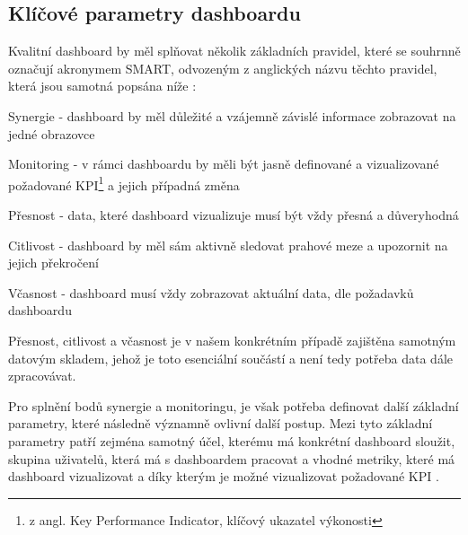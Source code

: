 \documentclass[
  digital,     %
  twoside,     %
  lof,         %
  lot,         %
]{fithesis4}
\begin{document}
\subsection{Klíčové parametry dashboardu}
Kvalitní dashboard by měl splňovat několik základních pravidel, které se souhrnně označují akronymem SMART, odvozeným z anglických názvu těchto pravidel, která jsou samotná popsána níže \parencite[s.~1]{Kratochvil2014}:
\begin{compactitem}
    \item Synergie - dashboard by měl důležité a vzájemně závislé informace zobrazovat na jedné obrazovce
    \item Monitoring - v rámci dashboardu by měli být jasně definované a vizualizované požadované KPI\footnote{z angl. Key Performance Indicator, klíčový ukazatel výkonosti} a jejich případná změna
    \item Přesnost - data, které dashboard vizualizuje musí být vždy přesná a důveryhodná
    \item Citlivost - dashboard by měl sám aktivně sledovat prahové meze a upozornit na jejich překročení
    \item Včasnost - dashboard musí vždy zobrazovat aktuální data, dle požadavků dashboardu
\end{compactitem}
Přesnost, citlivost a včasnost je v našem konkrétním případě zajištěna samotným datovým skladem, jehož je toto esenciální součástí a není tedy potřeba data dále zpracovávat. 

Pro splnění bodů synergie a monitoringu, je však potřeba definovat další základní parametry, které následně významně ovlivní další postup. Mezi tyto základní parametry patří zejména samotný účel, kterému má konkrétní dashboard sloužit, skupina uživatelů, která má s dashboardem pracovat a vhodné metriky, které má dashboard vizualizovat a díky kterým je možné vizualizovat požadované KPI \parencite[s.~6]{Faron2016thesis}. 
\end{document}
